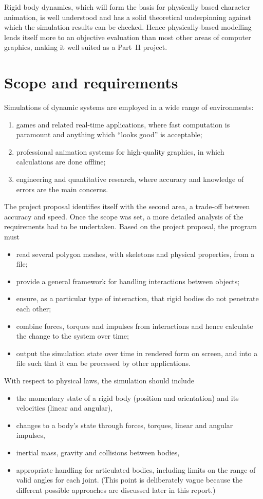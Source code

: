 Rigid body dynamics, which will form the basis for physically based character animation, is well
understood and has a solid theoretical underpinning against which the simulation results can be
checked. Hence physically-based modelling lends itself more to an objective evaluation than
most other areas of computer graphics, making it well suited as a Part~II project.

\section{Scope and requirements}

Simulations of dynamic systems are employed in a wide range of environments:
\begin{enumerate}
\item games and related real-time applications, where fast computation is paramount and anything
    which ``looks good'' is acceptable;
\item professional animation systems for high-quality graphics, in which calculations are done
    offline;
\item engineering and quantitative research, where accuracy and knowledge of errors are the main
    concerns.
\end{enumerate}

The project proposal identifies itself with the second area, a trade-off between accuracy and
speed. Once the scope was set, a more detailed analysis of the requirements had to be undertaken.
Based on the project proposal, the program must
\begin{itemize}
\item read several polygon meshes, with skeletons and physical properties, from a file;
\item provide a general framework for handling interactions between objects;
\item ensure, as a particular type of interaction, that rigid bodies do not penetrate each other;
\item combine forces, torques and impulses from interactions and hence calculate the change to
    the system over time;
\item output the simulation state over time in rendered form on screen, and into a file such that
    it can be processed by other applications.
\end{itemize}

With respect to physical laws, the simulation should include
\begin{itemize}
\item the momentary state of a rigid body (position and orientation) and its velocities (linear
    and angular),
\item changes to a body's state through forces, torques, linear and angular impulses,
\item inertial mass, gravity and collisions between bodies,
\item appropriate handling for articulated bodies, including limits on the range of valid angles
    for each joint. (This point is deliberately vague because the different possible approaches
    are discussed later in this report.)
\end{itemize}

